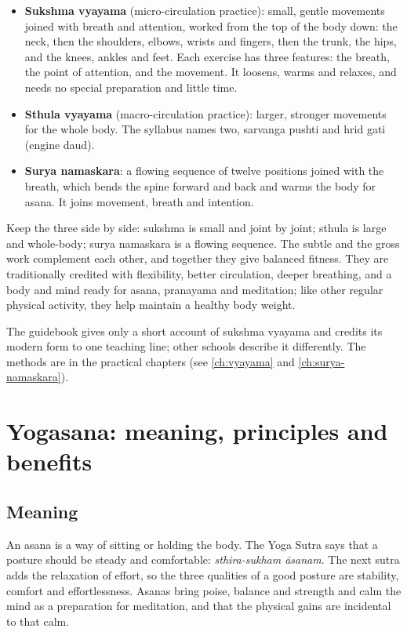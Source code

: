 \begin{itemize}
\item \textbf{Sukshma vyayama} (micro-circulation practice): small, gentle movements joined with breath and attention, worked from the top of the body down: the neck, then the shoulders, elbows, wrists and fingers, then the trunk, the hips, and the knees, ankles and feet. Each exercise has three features: the breath, the point of attention, and the movement. It loosens, warms and relaxes, and needs no special preparation and little time.
\item \textbf{Sthula vyayama} (macro-circulation practice): larger, stronger movements for the whole body. The syllabus names two, sarvanga pushti and hrid gati (engine daud).
\item \textbf{Surya namaskara}: a flowing sequence of twelve positions joined with the breath, which bends the spine forward and back and warms the body for asana. It joins movement, breath and intention.
\end{itemize}
Keep the three side by side: sukshma is small and joint by joint; sthula is large and whole-body; surya namaskara is a flowing sequence. The subtle and the gross work complement each other, and together they give balanced fitness. They are traditionally credited with flexibility, better circulation, deeper breathing, and a body and mind ready for asana, pranayama and meditation; like other regular physical activity, they help maintain a healthy body weight.

The guidebook gives only a short account of sukshma vyayama and credits its modern form to one teaching line; other schools describe it differently. The methods are in the practical chapters (see \cref{ch:vyayama} and \cref{ch:surya-namaskara}).

\section{Yogasana: meaning, principles and benefits}
\label{ch:asana-intro}

\subsection*{Meaning}
An asana is a way of sitting or holding the body. The Yoga Sutra says that a posture should be steady and comfortable: \emph{sthira-sukham āsanam}. The next sutra adds the relaxation of effort, so the three qualities of a good posture are stability, comfort and effortlessness. Asanas bring poise, balance and strength and calm the mind as a preparation for meditation, and that the physical gains are incidental to that calm.

